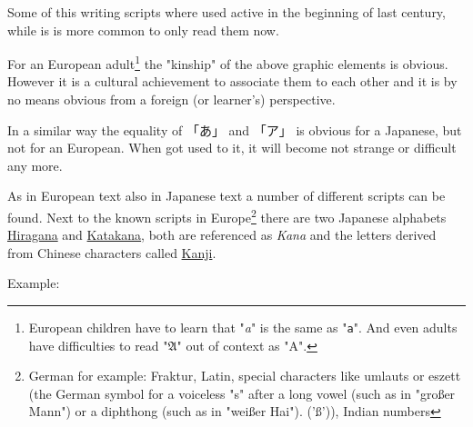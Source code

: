 Some of this writing scripts where used active in the beginning of last
century, while is is more common to only read them now. 

For an European adult\footnote{European children have to learn that
"\textit{a}" is the same as "\texttt{a}". And even adults have difficulties to
read "$\mathfrak{A}$" out of context as "A".}  the "kinship" of the above
graphic elements is obvious. However it is a cultural achievement to associate
them to each other and it is by no means obvious from a foreign (or learner's)
perspective. 

In a similar way the equality of {「あ」} and {「ア」} is obvious for a
Japanese, but not for an European. When got used to it, it will become not
strange or difficult any more.

As in European text also in Japanese text a number of different scripts can be
found. Next to the known scripts in Europe\footnote{German for example:
Fraktur, Latin, special characters like umlauts or eszett (the German
symbol for a voiceless "s" after a long vowel (such as in "großer Mann") or a
diphthong (such as in "weißer Hai"). ('ß')), Indian numbers} there are two
Japanese alphabets
 \hyperref[sec:Hiragana]{Hiragana} and
\hyperref[sec:Katakana]{Katakana}, both are referenced as \textit{Kana} and
the letters derived from Chinese characters called \hyperref[sec:Kanji]{Kanji}.

Example:

